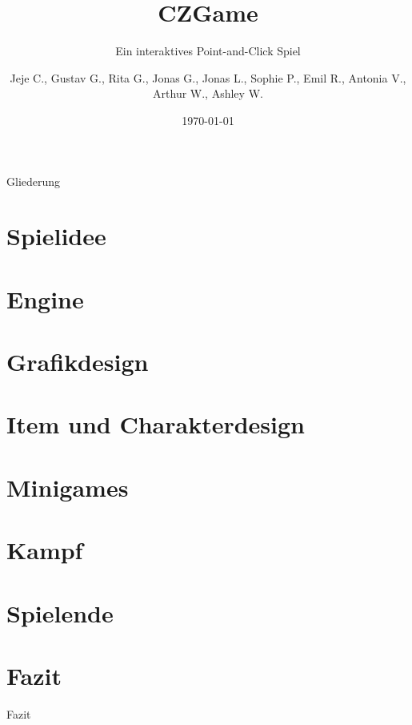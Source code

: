 \documentclass{beamer}
\title{CZGame}
\subtitle{Ein interaktives Point-and-Click Spiel}
\author{Jeje C., Gustav G., Rita G., Jonas G., Jonas L., Sophie P., Emil R., Antonia V., Arthur W., Ashley W.}
\institute[CZG]{Carl-Zeiss-Gymnasium Jena}
\date{\today}
\begin{document}
	
	\begin{frame}
		\titlepage
	\end{frame}
	
	\begin{frame}{Gliederung}
		\tableofcontents[pausesections]
	\end{frame}
	
	\section{Spielidee}
	
	
	\section{Engine}
	
	
	\section{Grafikdesign}
	
	
	\section{Item und Charakterdesign}
	
	
	\section{Minigames}
	
	
	\section{Kampf}
	

	\section{Spielende}
	

	\section{Fazit}
    	\begin{frame}
        	\begin{center}
        		\Huge Fazit
        	\end{center}
        \end{frame}
\end{document}
